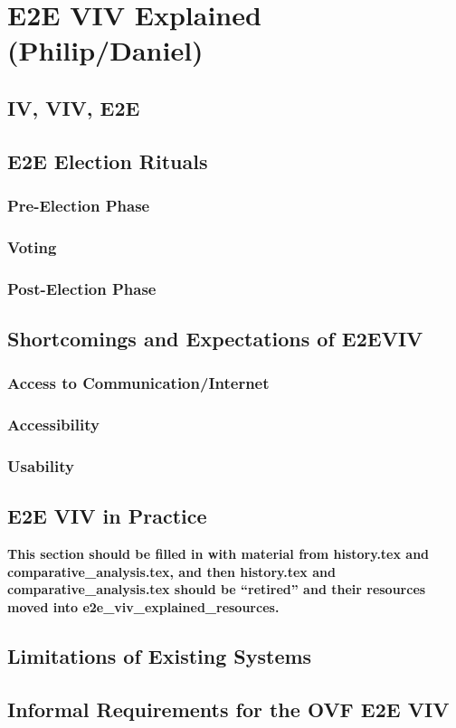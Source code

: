 \chapter{E2E VIV Explained (Philip/Daniel)}

\section{IV, VIV, E2E}
\section{E2E Election Rituals}
\subsection{Pre-Election Phase}
\subsection{Voting}
\subsection{Post-Election Phase}
\section{Shortcomings and Expectations of E2EVIV}
\subsection{Access to Communication/Internet}
\subsection{Accessibility}
\subsection{Usability}
\section{E2E VIV in Practice}
\textbf{This section should be filled in with material from
  history.tex and comparative\_analysis.tex, and then history.tex and
  comparative\_analysis.tex should be ``retired'' and their resources
  moved into e2e\_viv\_explained\_resources.}
\section{Limitations of Existing Systems}
\section{Informal Requirements for the OVF E2E VIV}
